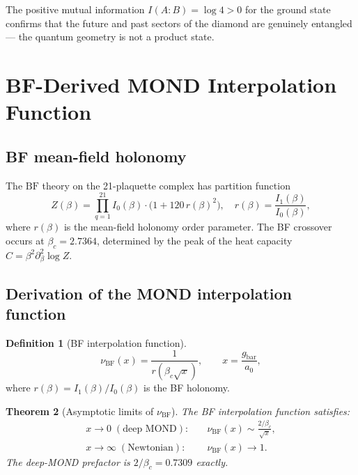 \documentclass[12pt,a4paper]{article}
\theoremstyle{plain}
\newtheorem{theorem}{Theorem}[section]
\theoremstyle{definition}
\newtheorem{definition}[theorem]{Definition}
\newcommand{\betac}{\beta_c}
\newcommand{\nuBF}{\nu_{\mathrm{BF}}}
\begin{document}
The positive mutual information $I(A:B) = \log 4 > 0$ for the ground
state confirms that the future and past sectors of the diamond are
genuinely entangled — the quantum geometry is not a product state.

\section{BF-Derived MOND Interpolation Function}
\label{sec:mond}

\subsection{BF mean-field holonomy}

The $\mathrm{BF}$ theory on the 21-plaquette complex has partition function
\begin{equation}
  Z(\beta) = \prod_{q=1}^{21} I_0(\beta) \cdot
  \bigl(1 + 120\, r(\beta)^2\bigr),
  \quad r(\beta) = \frac{I_1(\beta)}{I_0(\beta)},
\end{equation}
where $r(\beta)$ is the mean-field holonomy order parameter.  The BF
crossover occurs at $\betac = 2.7364$, determined by the peak of the
heat capacity $C = \beta^2 \partial_\beta^2 \log Z$.

\subsection{Derivation of the MOND interpolation function}

\begin{definition}[BF interpolation function]
  \begin{equation}
    \nuBF(x) = \frac{1}{r\!\left(\betac \sqrt{x}\right)}, \qquad
    x = \frac{g_{\mathrm{bar}}}{a_0},
    \label{eq:nuBF}
  \end{equation}
  where $r(\beta) = I_1(\beta)/I_0(\beta)$ is the BF holonomy.
\end{definition}

\begin{theorem}[Asymptotic limits of $\nuBF$]
\label{thm:mond_limits}
  The BF interpolation function satisfies:
  \begin{align}
    x \to 0 \;(\text{deep MOND}): &\quad \nuBF(x) \sim \frac{2/\betac}{\sqrt{x}}, \\
    x \to \infty \;(\text{Newtonian}): &\quad \nuBF(x) \to 1.
  \end{align}
  The deep-MOND prefactor is $2/\betac = 0.7309$ exactly.
\end{theorem}
\end{document}
